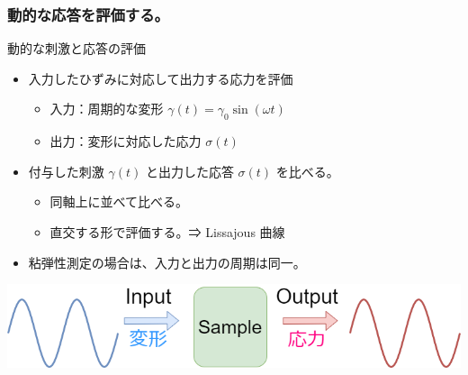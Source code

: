 \documentclass[12pt, dvipdfmx]{beamer}
\begin{document}
\begin{frame}
	\frametitle{動的な応答を評価する。}
		\begin{block}{動的な刺激と応答の評価}
			\begin{itemize}
				\item 入力したひずみに対応して出力する応力を評価
				\begin{itemize}
					\item 入力：周期的な変形 $\gamma(t) = \gamma_0 \sin(\omega t)$
					\item 出力：変形に対応した応力 $\sigma(t)$
				\end{itemize}
				\item 付与した刺激 $\gamma (t)$ と出力した応答 $\sigma (t)$ を比べる。
				\begin{itemize}
					\item 同軸上に並べて比べる。
					\item 直交する形で評価する。⇒ Lissajous 曲線
				\end{itemize}
				\item 粘弾性測定の場合は、入力と出力の周期は同一。
			\end{itemize}
		\end{block}
		\vspace{3mm}
		\centering
			\includegraphics[width=\textwidth]{dynamic_IO.png}
\end{frame}
\end{document}
